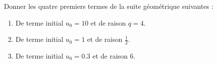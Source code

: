 
\begin{exercice}\label{exosmath-0307}

    Donner les quatre premiers termes de la suite géométrique suivantes :
    \begin{enumerate}
        \item
            De terme initial \( u_0=10\) et de raison \( q=4\).
        \item
            De terme initial \( u_0=1\) et de raison \( \frac{ 1 }{2}\).
        \item
            De terme initial \( u_0=0.3\) et de raison \( 6\).
    \end{enumerate}

\end{exercice}
